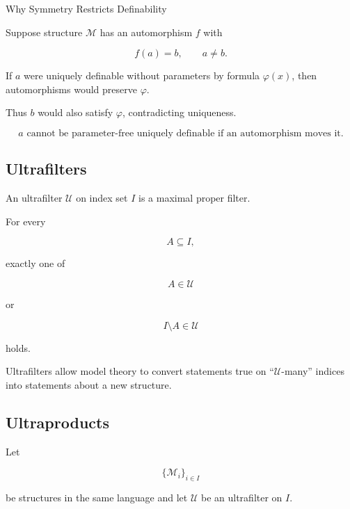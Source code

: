 \begin{workedexamplebox}{Why Symmetry Restricts Definability}

Suppose structure \(\mathcal{M}\) has an automorphism \(f\) with

\[
f(a)=b,
\qquad
a\neq b.
\]

If \(a\) were uniquely definable without parameters by formula
\(\varphi(x)\), then automorphisms would preserve \(\varphi\).

Thus \(b\) would also satisfy \(\varphi\), contradicting uniqueness.

\begin{answerbox}
\[
\boxed{
a
\text{ cannot be parameter-free uniquely definable if an automorphism
moves it.}
}
\]
\end{answerbox}

\end{workedexamplebox}

\subsection{Ultrafilters}
\label{subsec:model-theoretic-ultrafilters}

An ultrafilter \(\mathcal{U}\) on index set \(I\) is a maximal proper
filter.

For every

\[
A\subseteq I,
\]

exactly one of

\[
\boxed{
A\in\mathcal{U}
}
\]

or

\[
\boxed{
I\setminus A\in\mathcal{U}
}
\]

holds.

Ultrafilters allow model theory to convert statements true on
``\(\mathcal{U}\)-many'' indices into statements about a new structure.

\subsection{Ultraproducts}
\label{subsec:ultraproducts}

Let

\[
\{
\mathcal{M}_i
\}_{i\in I}
\]

be structures in the same language and let \(\mathcal{U}\) be an
ultrafilter on \(I\).

